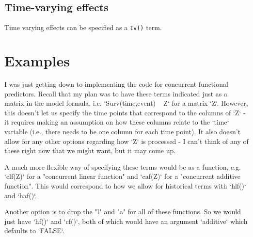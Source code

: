 \documentclass[12pt]{article}
\begin{document}
\subsection{Time-varying effects}
Time varying effects can be specified as a \texttt{tv()} term.

\section{Examples}




I was just getting down to implementing the code for concurrent functional predictors. Recall that my plan was to have these terms indicated just as a matrix in the model formula, i.e. `Surv(time,event) ~ Z` for a matrix `Z`. However, this doesn't let us specify the time points that correspond to the columns of `Z` - it requires making an assumption on how these columns relate to the `time` variable (i.e., there needs to be one column for each time point). It also doesn't allow for any other options regarding how `Z` is processed - I can't think of any of these right now that we might want, but it may come up.

A much more flexible way of specifying these terms would be as a function, e.g. `clf(Z)` for a "concurrent linear function" and `caf(Z)` for a "concurrent additive function". This would correspond to how we allow for historical terms with `hlf()` and `haf()`.

Another option is to drop the "l" and "a" for all of these functions. So we would just have `hf()` and `cf()`, both of which would have an argument `additive` which defaults to `FALSE`.

\begin{singlespace}

\scriptsize

\end{singlespace}
\end{document}
